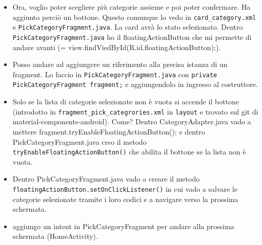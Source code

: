 \begin{itemize}
\begin{itemize}
        \item Ora, voglio poter scegliere più categorie assieme e poi poter confermare. Ha aggiunto perciò un bottone. Questo comunque lo vedo in \texttt{card\_category.xml} e \texttt{PickCategoryFragment.java}. La card avrà lo stato selezionato. Dentro \texttt{PickCategoryFragment.java} ho il floatingActionButton che mi permette di andare avanti (= view.findViedById(R.id.floatingActionButton);).
        \item Posso andare ad aggiungere un riferimento alla precisa istanza di un fragment. Lo faccio in \texttt{PickCategoryFragment.java} con \texttt{private PickCategoryFragment fragment;} e aggiungendolo in ingresso al costruttore.
        \item Solo se la lista di categorie selezionate non è vuota si accende il bottone (introdotto in \texttt{fragment\_pick\_categrories.xml} in \texttt{layout} e trovato sul git di material-components-android). Come? Dentro CategoryAdapter.java vado a mettere fragment.tryEnableFloatingActionButton(); e dentro PickCategoryFragment.java creo il metodo \texttt{tryEnableFloatingActionButton()} che abilita il bottone se la lista non è vuota.
        \item Dentro PickCategoryFragment.java vado a creare il metodo \texttt{floatingActionButton.setOnClickListener()} in cui vado a salvare le categorie selezionate tramite i loro codici e a navigare verso la prossima schermata.
        \item aggiungo un intent in PickCategoryFragment per andare alla prossima schermata (HomeActivity).
    \end{itemize}
\end{itemize}

